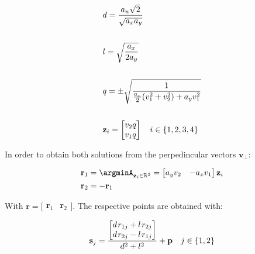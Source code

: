 \begin{align}
    &d = \frac{a_u\sqrt{2}}{\sqrt{a_xa_y}} \label{eq:Constraint_Tangent_Point_auxElement1} \\
    \notag \\
    &l = \sqrt{\frac{a_x}{2a_y}} \label{eq:Constraint_Tangent_Point_auxElement2} \\
    \notag \\
    &q = \pm\sqrt{\frac{1}{\frac{a_x}{2}(v_1^2 + v_2^2) + a_yv_1^2}}  \label{eq:Constraint_Tangent_Point_auxAuxElement} \\
    \notag \\
    &\mathbf{z}_i = \begin{bmatrix}  v_2 q \\ v_1 q \end{bmatrix} \quad i \in \{1,2,3,4\} \label{eq:Constraint_Tangent_Point_auxVector} 
\end{align}

In order to obtain both solutions from the perpedincular vectors \(\mathbf{v}_{\perp}\):

\begin{subequations}
    \begin{align}
        &\mathbf{r}_1 = \argminA_{\mathbf{z}_i \in \mathbb{R}^2} = \begin{bmatrix} a_yv_2 & - a_xv_1 \end{bmatrix} \mathbf{z}_{i} \label{eq:Constraint_Tangent_Point_bc_per} \\
        &\mathbf{r}_2 = -\mathbf{r}_1 \label{eq:Constraint_Tangent_Point_bc_perp_inverse}
    \end{align}
    \label{eq:Constraint_Tangent_Point_bc}
\end{subequations}   

    

With \(\mathbf{r} = \bigl[\begin{smallmatrix} \mathbf{r}_1&\mathbf{r}_2\end{smallmatrix} \bigr]\). The respective points are obtained with:

\begin{equation}
    \mathbf{s}_j = \frac{\begin{bmatrix} d \hspace{0.1em}r_{1j} + l \hspace{0.1em}r_{2j} \\ d \hspace{0.1em} r_{2j} - l \hspace{0.1em} r_{1j}\end{bmatrix}}{d^2 + l^2} + \mathbf{p} \quad j\in \{1,2\}
    \label{eq:Constraint_Tangent_Points}
\end{equation}

